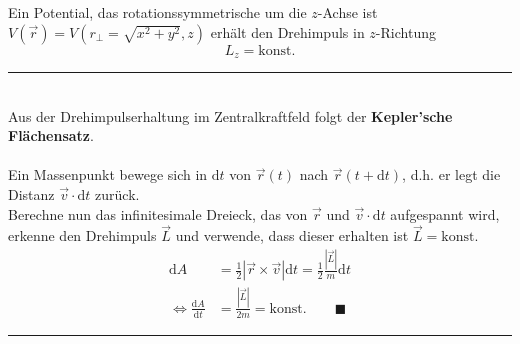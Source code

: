 \documentclass{article}
\newcommand{\diff}{\mathrm{d}}
\begin{document}
Ein Potential, das rotationssymmetrische um die $z$-Achse ist $V(\vec{r}) = V(r_\perp = \sqrt{x^2 + y^2}, z)$ erhält den Drehimpuls in $z$-Richtung
	\begin{equation}
		L_z = \text{konst.}
	\end{equation}

\vspace{0.5cm}

{\color{blue}
\hrule
	\\
	Aus der Drehimpulserhaltung im Zentralkraftfeld folgt der \textbf{Kepler'sche Flächensatz}.\\
	\\
	Ein Massenpunkt bewege sich in $\diff t$ von $\vec{r}(t)$ nach $\vec{r}(t+\diff t)$, d.h. er legt die Distanz $\vec{v}\cdot \diff t$ zurück.\\
	Berechne nun das infinitesimale Dreieck, das von $\vec{r}$ und $\vec{v}\cdot \diff t$ aufgespannt wird, erkenne den Drehimpuls $\vec{L}$ und verwende, dass dieser erhalten ist $\vec{L} = \text{konst.}$
		\begin{align*}
			\diff A &= \frac{1}{2}|\vec{r} \times \vec{v}| \diff t = \frac{1}{2} \frac{|\vec{L}|}{m}\diff t \\
			\Leftrightarrow \frac{\diff A}{\diff t} &= \frac{|\vec{L}|}{2m} = \text{konst.} \qquad\blacksquare
		\end{align*}



\hrule
}



\newpage


\vspace{0.5cm}
\end{document}
